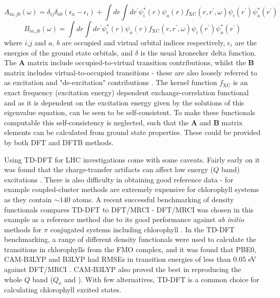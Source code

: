 \begin{equation}
A_{ia,jb}\left(\omega\right) = \delta_{ij}\delta_{ab}\left(\epsilon_a - \epsilon_i\right) + \int dr \int dr^\prime \psi_i^*\left(r\right) \psi_a\left(r\right) f_{\text{XC}}\left(r, r^\prime, \omega\right) \psi_i\left(r^\prime\right) \psi_a^*\left(r^\prime\right)
\label{eq:full_A_integrals}
\end{equation}
%
\begin{equation}
B_{ia,jb}\left(\omega\right) = \int dr \int dr^\prime \psi_i^*\left(r\right) \psi_a\left(r\right) f_{\text{XC}}\left(r, r^\prime, \omega\right) \psi_i\left(r^\prime\right) \psi_a^*\left(r^\prime\right)
\end{equation}
%
where $i$,$j$ and $a$, $b$ are occupied and virtual orbital indices respectively, $\epsilon_i$
are the energies of the ground state orbitals, and $\delta$ is the usual kronecker 
delta function. The $\mathbf{A}$ matrix include occupied-to-virtual transition contributions,
whilst the $\mathbf{B}$ matrix includes virtual-to-occupied transitions - these 
are also loosely referred to as excitation and "de-excitation" contributions \cite{Casida2012}.  
The kernel function $f_{\text{XC}}$ is an exact frequency (excitation energy) 
dependent exchange-correlation functional and as it is dependent on the excitation 
energy given by the solutions of this eigenvalue equation, can be seen to be self-consistent.
To make these functionals computable this self-consistency is neglected, such that
the $\mathbf{A}$ and $\mathbf{B}$ matrix elements can be calculated from ground
state properties. These could be provided by both DFT and DFTB methods.

Using TD-DFT for LHC investigations come with some caveats. Fairly early on it was 
found that the charge-transfer artifacts can affect low energy ($Q$ band) excitations
\cite{Dahlbom2005}. There is also difficulty in obtaining good reference data - 
for example coupled-cluster methods are extremely expensive for chlorophyll systems
as they contain $\sim 140$ atoms. A recent successful benchmarking of density functionals 
compares TD-DFT to DFT/MRCI - DFT/MRCI was chosen in this example as a reference 
method due to its good performance against \emph{ab initio} methods for $\pi$ conjugated
systems including chlorophyll \cite{Marian2008, Perun2008, Etinski2011, Parusel2000}. 
In the TD-DFT benchmarking, a range of different density functionals were used to
calculate the \Qy transitions in chlorophylls from the FMO complex, and it was found
that PBE0, CAM-B3LYP and B3LYP had RMSEs in transition energies of less than 0.05 
eV against DFT/MRCI \cite{List2013}. CAM-B3LYP also proved the best in reproducing 
the whole $Q$ band ($Q_x$ and \Qy). With few alternatives, TD-DFT is a common choice
for calculating chlorophyll excited states.

